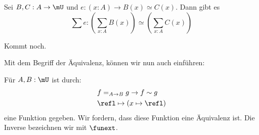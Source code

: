 \begin{lemma}
  Sei $B,C:A\to\mU$ und $e:(x:A)\to B(x)\simeq C(x)$.
  Dann gibt es
  \[\sum e : \left(\sum_{x:A}B(x)\right)\simeq \left(\sum_{x:A}C(x)\right)\]
\end{lemma}

\begin{beweis}
  Kommt noch.
\end{beweis}


Mit dem Begriff der Äquivalenz, können wir nun auch  einführen:

\begin{axiom}
  Für $A,B:\mU$ ist durch:
  \begin{align*}
    &f=_{A\to B}g \to f\sim g \\
    &\refl\mapsto (x\mapsto \refl)
  \end{align*}
  eine Funktion gegeben. Wir fordern, dass diese Funktion eine Äquivalenz ist.
  Die Inverse bezeichnen wir mit $\funext$\index{$\funext$}.
\end{axiom}
